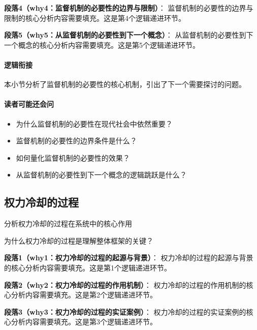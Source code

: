 \documentclass[../main.tex]{subfiles}
\begin{document}
{{\textbf{段落4（why4：监督机制的必要性的边界与限制）}：
监督机制的必要性的边界与限制的核心分析内容需要填充。这是第4个逻辑递进环节。


\textbf{段落5（why5：从监督机制的必要性到下一个概念）}：
从监督机制的必要性到下一个概念的核心分析内容需要填充。这是第5个逻辑递进环节。


\paragraph*{逻辑衔接}
本小节分析了监督机制的必要性的核心机制，引出了下一个需要探讨的问题。

\paragraph*{读者可能还会问}
\begin{itemize}
\item 为什么监督机制的必要性在现代社会中依然重要？
\item 监督机制的必要性的边界条件是什么？
\item 如何量化监督机制的必要性的效果？
\item 从监督机制的必要性到下一个概念的逻辑跳跃是什么？
\end{itemize}


\subsection{权力冷却的过程}

\begin{motivation}
分析权力冷却的过程在系统中的核心作用
\end{motivation}

\begin{logicmap}
[逻辑链占位]
\end{logicmap}

\begin{questionbox}
为什么权力冷却的过程是理解整体框架的关键？
\end{questionbox}

\textbf{段落1（why1：权力冷却的过程的起源与背景）}：
权力冷却的过程的起源与背景的核心分析内容需要填充。这是第1个逻辑递进环节。


\textbf{段落2（why2：权力冷却的过程的作用机制）}：
权力冷却的过程的作用机制的核心分析内容需要填充。这是第2个逻辑递进环节。


\textbf{段落3（why3：权力冷却的过程的实证案例）}：
权力冷却的过程的实证案例的核心分析内容需要填充。这是第3个逻辑递进环节。


}}
\end{document}
